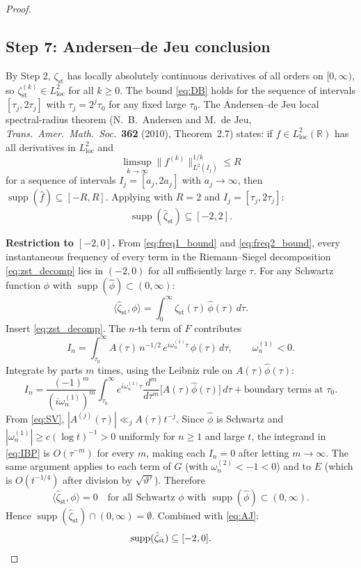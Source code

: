\documentclass[11pt]{article}
\theoremstyle{definition}
\begin{document}
\begin{proof}
\subsection*{Step 7: Andersen--de Jeu conclusion}

By Step 2, $\zeta_{\mathrm{st}}$ has locally absolutely continuous
derivatives of all orders on $[0,\infty)$, so $\zeta_{\mathrm{st}}^{(k)}
\in L^2_{\mathrm{loc}}$ for all $k\ge 0$.  The bound \eqref{eq:DB}
holds for the sequence of intervals $[\tau_j,2\tau_j]$ with
$\tau_j=2^j\tau_0$ for any fixed large $\tau_0$.  The Andersen--de Jeu
local spectral-radius theorem (N.~B.\ Andersen and M.\ de Jeu,
\textit{Trans.\ Amer.\ Math.\ Soc.}\ \textbf{362} (2010), Theorem~2.7)
states: if $f\in L^2_{\mathrm{loc}}(\mathbb{R})$ has all derivatives in
$L^2_{\mathrm{loc}}$ and
\[
\limsup_{k\to\infty}\|f^{(k)}\|_{L^2(I_j)}^{1/k}\le R
\]
for a sequence of intervals $I_j=[a_j,2a_j]$ with $a_j\to\infty$,
then $\operatorname{supp}(\hat f)\subseteq[-R,R]$.  Applying with
$R=2$ and $I_j=[\tau_j,2\tau_j]$:
\begin{equation}\label{eq:AJ}
\operatorname{supp}(\hat\zeta_{\mathrm{st}})\subseteq[-2,2].
\end{equation}

\textbf{Restriction to $[-2,0]$.}
From \eqref{eq:freq1_bound} and \eqref{eq:freq2_bound}, every
instantaneous frequency of every term in the Riemann--Siegel
decomposition \eqref{eq:zst_decomp} lies in $(-2,0)$ for all
sufficiently large $\tau$.  For any Schwartz function $\phi$ with
$\operatorname{supp}(\hat\phi)\subset(0,\infty)$:
\[
\langle\hat\zeta_{\mathrm{st}},\phi\rangle
=\int_0^\infty\zeta_{\mathrm{st}}(\tau)\,\hat\phi(\tau)\,d\tau.
\]
Insert \eqref{eq:zst_decomp}.  The $n$-th term of $F$ contributes
\[
I_n=\int_{\tau_0}^\infty
A(\tau)\,n^{-1/2}\,e^{i\omega_n^{(1)}\tau}\,\hat\phi(\tau)\,d\tau,
\qquad\omega_n^{(1)}<0.
\]
Integrate by parts $m$ times, using the Leibniz rule on
$A(\tau)\hat\phi(\tau)$:
\begin{equation}\label{eq:IBP}
I_n=\frac{(-1)^m}{(i\omega_n^{(1)})^m}
\int_{\tau_0}^\infty e^{i\omega_n^{(1)}\tau}
\frac{d^m}{d\tau^m}\bigl[A(\tau)\hat\phi(\tau)\bigr]\,d\tau
+\text{boundary terms at }\tau_0.
\end{equation}
From \eqref{eq:SV}, $|A^{(j)}(\tau)|\ll_j A(\tau) t^{-j}$.  Since
$\hat\phi$ is Schwartz and $|\omega_n^{(1)}|\ge c(\log t)^{-1}>0$
uniformly for $n\ge 1$ and large $t$, the integrand in
\eqref{eq:IBP} is $O(\tau^{-m})$ for every $m$, making each $I_n=0$
after letting $m\to\infty$.  The same argument applies to each term
of $G$ (with $\omega_n^{(2)}<-1<0$) and to $E$ (which is
$O(t^{-1/4})$ after division by $\sqrt{\vartheta'}$).  Therefore
\[
\langle\hat\zeta_{\mathrm{st}},\phi\rangle=0
\quad\text{for all Schwartz }\phi\text{ with }
\operatorname{supp}(\hat\phi)\subset(0,\infty).
\]
Hence $\operatorname{supp}(\hat\zeta_{\mathrm{st}})\cap(0,\infty)=\emptyset$.
Combined with \eqref{eq:AJ}:
\[
\operatorname{supp}(\hat\zeta_{\mathrm{st}})\subseteq[-2,0].\qquad\qedhere
\]
\end{proof}
\end{document}
